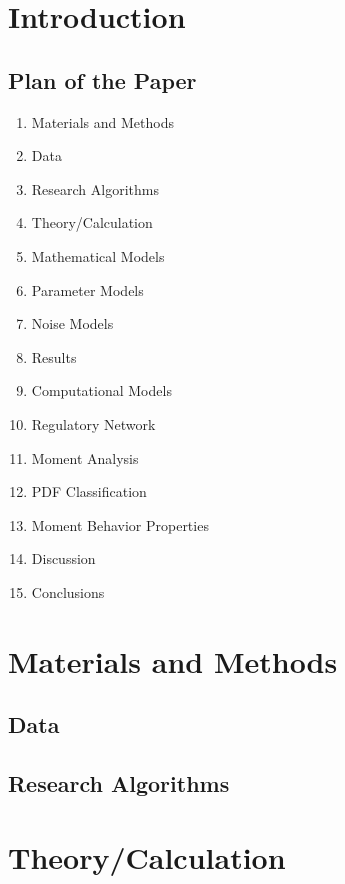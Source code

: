 







\section{Introduction}

\subsection{Plan of the Paper}

\begin{enumerate}
	\item Materials and Methods
	\item Data
	\item Research Algorithms
	\item Theory/Calculation
	\item Mathematical Models
	\item Parameter Models
	\item Noise Models
	\item Results
	\item Computational Models
	\item Regulatory Network
	\item Moment Analysis
	\item PDF Classification
	\item Moment Behavior Properties
	\item Discussion
	\item Conclusions
\end{enumerate}

\section{Materials and Methods}

\subsection{Data}

\subsection{Research Algorithms}


\section{Theory/Calculation}


